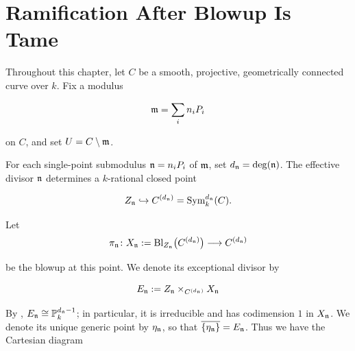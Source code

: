 
\chapter{Ramification After Blowup Is Tame}


Throughout this chapter, let $C$ be a smooth, projective, geometrically connected
curve over $k$. Fix a modulus

\[
    \mathfrak{m} = \sum_i n_i P_i
\]

on $C$, and set $U = C \setminus \mathfrak{m}$.

For each single-point submodulus $\mathfrak{n} = n_i P_i$ of $\mathfrak{m}$, set
$d_{\mathfrak{n}} = \deg(\mathfrak{n})$. The effective divisor $\mathfrak{n}$ determines a
$k$-rational closed point

\[
    Z_{\mathfrak{n}} \hookrightarrow C^{(d_{\mathfrak{n}})}
        = \operatorname{Sym}^{d_{\mathfrak{n}}}_k(C).
\]

Let
\[
    \pi_{\mathfrak{n}} \colon
    X_{\mathfrak{n}} := \operatorname{Bl}_{Z_{\mathfrak{n}}}\bigl(C^{(d_{\mathfrak{n}})}\bigr)
    \longrightarrow C^{(d_{\mathfrak{n}})}
\]

be the blowup at this point. We denote its exceptional divisor by

\[
    E_{\mathfrak{n}} := Z_{\mathfrak{n}} \times_{C^{(d_{\mathfrak{n}})}} X_{\mathfrak{n}}
\]

By
,
$E_{\mathfrak{n}}\cong\mathbb P_k^{d_{\mathfrak{n}}-1}$; in particular, it is irreducible and
has codimension $1$ in $X_{\mathfrak{n}}$. We denote its unique generic point by
$\eta_{\mathfrak{n}}$, so that $\overline{\{\eta_{\mathfrak{n}}\}}=E_{\mathfrak{n}}$. Thus we have the
Cartesian diagram

